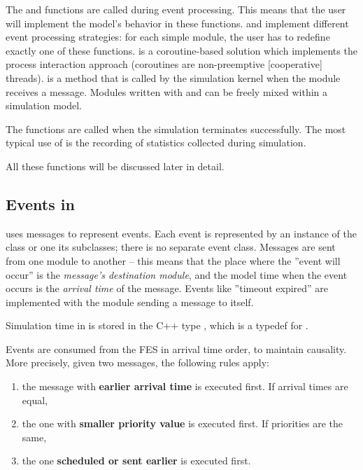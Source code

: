 The  and  functions are
called during event processing. This means that the user will
implement the model's behavior in these functions.
 and  implement
different event processing strategies: for each simple module, the user
has to redefine exactly one of these functions.  is
a coroutine-based solution which implements the
process interaction approach (coroutines are non-pre\-emp\-tive
[cooperative] threads).  is a method that is called
by the simulation kernel when the module receives a message.
Modules written with  and 
can be freely mixed within a simulation model.

The  functions are called when the simulation
terminates successfully. The most typical use of 
is the recording of statistics collected during simulation.

All these functions will be discussed later in detail.





\subsection{Events in {\opp}}

{\opp} uses messages to represent
events. Each event is represented by an instance of the
 class or one its subclasses; there is no separate
event class. Messages are sent from one module to another -- this
means that the place where the ''event will occur'' is the
\textit{message's destination module}, and the model time when the
event occurs is the \textit{arrival time} of the
message. Events like ''timeout expired'' are implemented with the
module sending a message to itself.

Simulation time in {\opp} is stored in the C++ type
, which is a typedef for .

Events are consumed from the FES in arrival time order, to
maintain causality. More precisely, given two messages, the following
rules apply:
\begin{enumerate}
\item{the message with \textbf{earlier arrival time} is executed
    first.  If arrival times are equal,}
\item{the one with \textbf{smaller priority value} is executed first.
    If priorities are the same,}
\item{the one \textbf{scheduled or sent earlier} is executed first.}
\end{enumerate}

